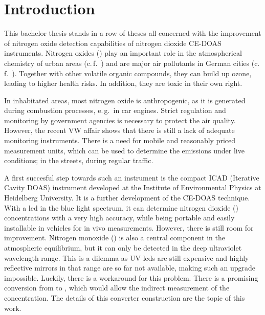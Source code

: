 \section{Introduction}
\label{sec:intro}

This bachelor thesis stands in a row of theses all concerned with the
improvement of nitrogen oxide detection capabilities of nitrogen
dioxide CE-DOAS instruments. Nitrogen oxides () play an
important role in the atmospherical chemistry of urban areas
(c.\,f.~\cite{roedel}) and are major air pollutants in German cities
(c.\,f.~\cite{no2schadstoff,who}). Together with other volatile
organic compounds, they can build up ozone, leading to higher health
risks. In addition, they are toxic in their own right.

In inhabitated areas, most nitrogen oxide is anthropogenic, as it is
generated during combustion processes, e.\,g.\ in car engines. Strict
regulation and monitoring by government agencies is necessary to
protect the air quality. However, the recent VW affair shows that
there is still a lack of adequate monitoring instruments. There is a
need for mobile and reasonably priced measurement units, which can be
used to determine the  emissions under live conditions; in
the streets, during regular traffic.

A first succesful step towards such an instrument is the compact
 ICAD (Iterative Cavity DOAS) instrument developed at the
Institute of Environmental Physics at Heidelberg University. It is a
further development of the CE-DOAS technique. With a led in the blue
light spectrum, it can determine nitrogen dioxide ()
concentrations with a very high accuracy, while being portable and
easily installable in vehicles for in vivo measurements. However,
there is still room for improvement. Nitrogen monoxide () is
also a central component in the atmospheric  equilibrium, but
it can only be detected in the deep ultraviolet wavelength range. This
is a dilemma as UV leds are still expensive and highly reflective
mirrors in that range are so far not available, making such an upgrade
impossible. Luckily, there is a workaround for this problem. There is
a promising conversion from  to , which would allow the
indirect measurement of the concentration. The details of this
converter construction are the topic of this work.

